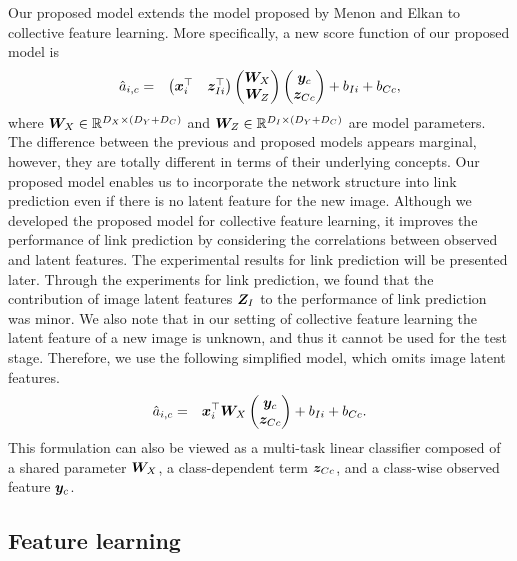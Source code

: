 \documentclass[letterpaper]{article} %
\begin{document}
Our proposed model extends the model proposed by Menon and Elkan to collective feature learning.
%
More specifically, a new score function of our proposed model is
\begin{eqnarray}
  \hat{a}_{i,c}
  &=& \begin{pmatrix}\bm{x}_i^{\top} & \bm{z}_{Ii}^{\top}\end{pmatrix}
      \begin{pmatrix}\bm{W}_X \\ \bm{W}_Z\end{pmatrix}
      \begin{pmatrix}\bm{y}_c \\ \bm{z}_{Cc}\end{pmatrix} + b_{Ii} + b_{Cc},
\end{eqnarray}
where $\bm{W}_X\in\mathbb R^{D_X\times(D_Y+D_C)}$ and $\bm{W}_Z\in\mathbb R^{D_I\times(D_Y+D_C)}$ are model parameters.
%
The difference between the previous and proposed models appears marginal, however, they are totally different in terms of their underlying concepts.
%
Our proposed model enables us to incorporate the network structure into link prediction even if there is no latent feature for the new image.
%
Although we developed the proposed model for collective feature learning, it improves the performance of link prediction by considering the correlations between observed and latent features.
%
The experimental results for link prediction will be presented later.
%
Through the experiments for link prediction, we found that the contribution of image latent features $\bm{Z}_I$ to the performance of link prediction was minor.
%
We also note that in our setting of collective feature learning the latent feature of a new image is unknown, and thus it cannot be used for the test stage.
%
Therefore, we use the following simplified model, which omits image latent features.
\begin{eqnarray}
  \hat{a}_{i,c}
  &=& \bm{x}_i^{\top} \bm{W}_X \begin{pmatrix}\bm{y}_c \\ \bm{z}_{Cc}\end{pmatrix} + b_{Ii} + b_{Cc}.
  \label{eq:linkscore:new}
\end{eqnarray}
%
This formulation can also be viewed as a multi-task linear classifier composed of a shared parameter $\bm{W}_X$, a class-dependent term $\bm{z}_{Cc}$, and a class-wise observed feature $\bm{y}_c$.

\subsection{Feature learning}
\label{sec:proposed:learning}
\indent
\end{document}
